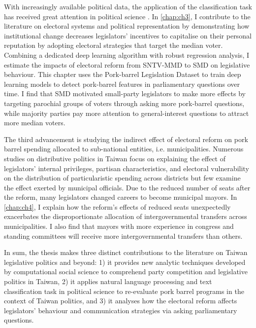 With increasingly available political data, the application of the classification task has received great attention in political science \citep[such as][]{Chatsiou2020, Engel2017}. In \autoref{chap:ch3}, I contribute to the literature on electoral systems and political representation by demonstrating how institutional change decreases legislators' incentives to capitalise on their personal reputation by adopting electoral strategies that target the median voter. Combining a dedicated deep learning algorithm with robust regression analysis, I estimate the impacts of electoral reform from SNTV-MMD to SMD on legislative behaviour. This chapter uses the Pork-barrel Legislation Dataset to train deep learning models to detect pork-barrel features in parliamentary questions over time. I find that SMD motivated small-party legislators to make more effects by targeting parochial groups of voters through asking more pork-barrel questions, while majority parties pay more attention to general-interest questions to attract more median voters. 

The third advancement is studying the indirect effect of electoral reform on pork barrel spending allocated to sub-national entities, i.e. municipalities. Numerous studies on distributive politics in Taiwan focus on explaining the effect of legislators' internal privileges, partisan characteristics, and electoral vulnerability on the distribution of particularistic spending across districts \citep[e.g.,][]{Luor2000, Luor2004, Luor2008, Lai2013} but few examine the effect exerted by municipal officials. Due to the reduced number of seats after the reform, many legislators changed careers to become municipal mayors. In \autoref{chap:ch4}, I explain how the reform's effects of reduced seats unexpectedly exacerbates the disproportionate allocation of intergovernmental transfers across municipalities. I also find that mayors with more experience in congress and standing committees will receive more intergovernmental transfers than others.

In sum, the thesis makes three distinct contributions to the literature on Taiwan legislative politics and beyond: 1) it provides new analytic techniques developed by computational social science to comprehend party competition and legislative politics in Taiwan, 2) it applies natural language processing and text classification task in political science to re-evaluate pork barrel programs in the context of Taiwan politics, and 3) it analyses how the electoral reform affects legislators' behaviour and communication strategies via asking parliamentary questions.

